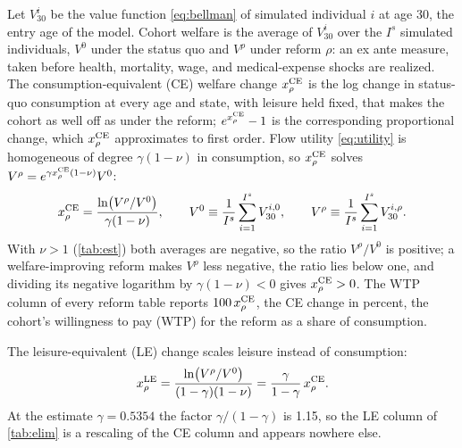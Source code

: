 Let $V^{i}_{30}$ be the value function \eqref{eq:bellman} of simulated individual $i$ at age 30, the entry age of the model.
Cohort welfare is the average of $V^{i}_{30}$ over the $I^{s}$ simulated individuals, $V^{0}$ under the status quo and $V^{\rho}$ under reform $\rho$: an ex ante measure, taken before health, mortality, wage, and medical-expense shocks are realized. The consumption-equivalent (CE) welfare change $x^{\mathrm{CE}}_{\rho}$ is the log change in status-quo consumption at every age and state, with leisure held fixed, that makes the cohort as well off as under the reform; $e^{x^{\mathrm{CE}}_{\rho}}-1$ is the corresponding proportional change, which $x^{\mathrm{CE}}_{\rho}$ approximates to first order. Flow utility \eqref{eq:utility} is homogeneous of degree $\gamma(1-\nu)$ in consumption, so $x^{\mathrm{CE}}_{\rho}$ solves $V^{\rho}=e^{\gamma x^{\mathrm{CE}}_{\rho}(1-\nu)}V^{0}$:
\begin{equation}\label{eq:ce}
x^{\mathrm{CE}}_{\rho}=\frac{\ln\!\left(V^{\rho}/V^{0}\right)}{\gamma(1-\nu)},
\qquad
V^{0}\equiv\frac{1}{I^{s}}\sum_{i=1}^{I^{s}}V^{i,0}_{30},
\qquad
V^{\rho}\equiv\frac{1}{I^{s}}\sum_{i=1}^{I^{s}}V^{i,\rho}_{30}.
\end{equation}
With $\nu>1$ (\autoref{tab:est}) both averages are negative, so the ratio $V^{\rho}/V^{0}$ is positive; a welfare-improving reform makes $V^{\rho}$ less negative, the ratio lies below one, and dividing its negative logarithm by $\gamma(1-\nu)<0$ gives $x^{\mathrm{CE}}_{\rho}>0$.
The WTP column of every reform table reports $100\,x^{\mathrm{CE}}_{\rho}$, the CE change in percent, the cohort's willingness to pay (WTP) for the reform as a share of consumption.

The leisure-equivalent (LE) change scales leisure instead of consumption:
\begin{equation}\label{eq:le}
x^{\mathrm{LE}}_{\rho}=\frac{\ln\!\left(V^{\rho}/V^{0}\right)}{(1-\gamma)(1-\nu)}=\frac{\gamma}{1-\gamma}\,x^{\mathrm{CE}}_{\rho}.
\end{equation}
At the estimate $\gamma=0.5354$ the factor $\gamma/(1-\gamma)$ is 1.15, so the LE column of \autoref{tab:elim} is a rescaling of the CE column and appears nowhere else.

